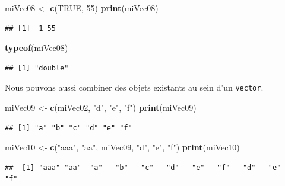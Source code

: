 \documentclass[]{book}
\newenvironment{Shaded}{\begin{snugshade}}{\end{snugshade}}
\newcommand{\KeywordTok}[1]{\textcolor[rgb]{0.13,0.29,0.53}{\textbf{#1}}}
\newcommand{\DecValTok}[1]{\textcolor[rgb]{0.00,0.00,0.81}{#1}}
\newcommand{\StringTok}[1]{\textcolor[rgb]{0.31,0.60,0.02}{#1}}
\newcommand{\OtherTok}[1]{\textcolor[rgb]{0.56,0.35,0.01}{#1}}
\newcommand{\NormalTok}[1]{#1}
\begin{document}
\begin{Shaded}
\begin{Highlighting}[]
\NormalTok{miVec08 <-}\StringTok{ }\KeywordTok{c}\NormalTok{(}\OtherTok{TRUE}\NormalTok{, }\DecValTok{55}\NormalTok{)}
\KeywordTok{print}\NormalTok{(miVec08)}
\end{Highlighting}
\end{Shaded}

\begin{verbatim}
## [1]  1 55
\end{verbatim}

\begin{Shaded}
\begin{Highlighting}[]
\KeywordTok{typeof}\NormalTok{(miVec08)}
\end{Highlighting}
\end{Shaded}

\begin{verbatim}
## [1] "double"
\end{verbatim}

Nous pouvons aussi combiner des objets existants au sein d'un
\texttt{vector}.

\begin{Shaded}
\begin{Highlighting}[]
\NormalTok{miVec09 <-}\StringTok{ }\KeywordTok{c}\NormalTok{(miVec02, }\StringTok{"d"}\NormalTok{, }\StringTok{"e"}\NormalTok{, }\StringTok{"f"}\NormalTok{)}
\KeywordTok{print}\NormalTok{(miVec09)}
\end{Highlighting}
\end{Shaded}

\begin{verbatim}
## [1] "a" "b" "c" "d" "e" "f"
\end{verbatim}

\begin{Shaded}
\begin{Highlighting}[]
\NormalTok{miVec10 <-}\StringTok{ }\KeywordTok{c}\NormalTok{(}\StringTok{"aaa"}\NormalTok{, }\StringTok{"aa"}\NormalTok{, miVec09, }\StringTok{"d"}\NormalTok{, }\StringTok{"e"}\NormalTok{, }\StringTok{"f"}\NormalTok{)}
\KeywordTok{print}\NormalTok{(miVec10)}
\end{Highlighting}
\end{Shaded}

\begin{verbatim}
##  [1] "aaa" "aa"  "a"   "b"   "c"   "d"   "e"   "f"   "d"   "e"   "f"
\end{verbatim}
\end{document}
